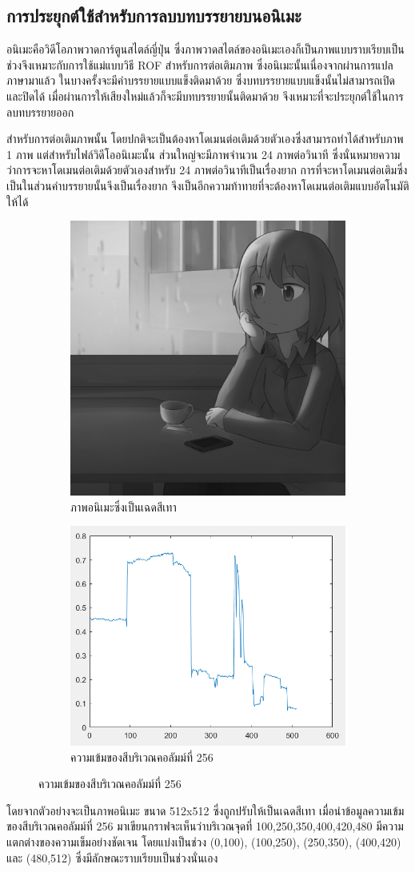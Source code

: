\documentclass[hidelinks,a4paper,14pt]{article}
\numberwithin{equation}{section}							%
\begin{document}
{		 \subsection{การประยุกต์ใช้สำหรับการลบบทบรรยายบนอนิเมะ}
		 \hspace{1cm}อนิเมะคือวิดีโอภาพวาดการ์ตูนสไตล์ญี่ปุ่น ซึ่งภาพวาดสไตล์ของอนิเมะเองก็เป็นภาพแบบราบเรียบเป็นช่วงจึงเหมาะกับการใช้แม่แบบวิธี ROF สำหรับการต่อเติมภาพ	ซึ่งอนิเมะนั้นเนื่องจากผ่านการแปลภาษามาแล้ว ในบางครั้งจะมีคำบรรยายแบบแข็งติดมาด้วย ซึ่งบทบรรยายแบบแข็งนั้นไม่สามารถเปิดและปิดได้ เมื่อผ่านการให้เสียงใหม่แล้วก็จะมีบทบรรยายนั้นติดมาด้วย จึงเหมาะที่จะประยุกต์ใช้ในการลบทบรรยายออก
		 
		 สำหรับการต่อเติมภาพนั้น โดยปกติจะเป็นต้องหาโดเมนต่อเติมด้วยตัวเองซึ่งสามารถทำได้สำหรับภาพ  1 ภาพ แต่สำหรับไฟล์วิดีโออนิเมะนั้น ส่วนใหญ่จะมีภาพจำนวน 24 ภาพต่อวินาที ซึ่งนั่นหมายความว่าการจะหาโดเมนต่อเติมด้วยตัวเองสำหรับ 24 ภาพต่อวินาทีเป็นเรื่องยาก การที่จะหาโดเมนต่อเติมซึ่งเป็นในส่วนคำบรรยายนั้นจึงเป็นเรื่องยาก จึงเป็นอีกความท้าทายที่จะต้องหาโดเมนต่อเติมแบบอัตโนมัติให้ได้
		 
		 \begin{figure}[H]
		 	\centering
		 	\begin{subfigure}{0.4\linewidth}
		 		\centering
		 		\includegraphics[width=0.4\linewidth]{images/show_peicewise/anime_gray.png}
		 		\caption{ภาพอนิเมะซึ่งเป็นเฉดสีเทา}
		 	\end{subfigure}
		 	\begin{subfigure}{0.4\linewidth}
		 		\centering
		 		\includegraphics[width=0.4\linewidth]{images/show_peicewise/anime_is_piecewise.png}
		 		\caption{ความเข้มของสีบริเวณคอลัมม์ที่ 256}
		 	\end{subfigure}				
		 \end{figure}
		 โดยจากตัวอย่างจะเป็นภาพอนิเมะ ขนาด 512x512 ซึ่งถูกปรับให้เป็นเฉดสีเทา เมื่อนำข้อมูลความเข้มของสีบริเวณคอลัมม์ที่ 256 มาเขียนกราฟจะเห็นว่าบริเวณจุดที่ 100,250,350,400,420,480 มีความแตกต่างของความเข็มอย่างชัดเจน โดยแบ่งเป็นช่วง (0,100), (100,250), (250,350), (400,420)  และ (480,512) ซึ่งมีลักษณะราบเรียบเป็นช่วงนั่นเอง
		 
}
\end{document}
